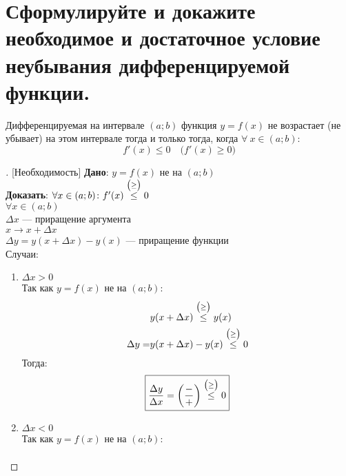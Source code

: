 \section{Сформулируйте и докажите необходимое и достаточное условие неубывания дифференцируемой функции.}

\begin{theorem}
	Дифференцируемая на интервале $(a;b)$ функция $y=f(x)$ не возрастает (не убывает) на этом интервале тогда и только тогда, когда $\forall\ x \in (a;b)\colon$
	\[ f'(x) \le 0\quad \Big(f'(x) \ge 0\Big) \]
\end{theorem}
\begin{proof}[][Необходимость]
	\textbf{Дано}: $y=f(x)$ не  на $(a;b)$\\
	\textbf{Доказать}: $\forall x \in (a;b)\colon f'(x) \overset{\scriptsize{\big(\ge \big)}}{\le} 0$\\
	$\forall x \in (a;b)$\\
	$\Delta x$ --- приращение аргумента\\
	$x \to x + \Delta x$\\
	$\Delta y = y(x + \Delta x) - y(x)$ --- приращение функции\\
	Случаи:
	\begin{enumerate}
		\item $\Delta x > 0$\\
		      Так как $y=f(x)$ не  на $(a;b)$: \vspace{-\topsep}
		      \begin{align*}
			                 & y(x+\Delta x) \overset{\scriptsize{\big(\ge \big)}}{\le} y(x)       \\
			      \Delta y = & y(x + \Delta x) - y(x) \overset{\scriptsize{\big(\ge \big)}}{\le} 0
		      \end{align*} \vspace{-\topsep}
		      Тогда:
		      \begin{gather*}
			      \boxed{\frac{\Delta y}{\Delta x} = \left(\frac{-}{+}\right) \overset{\scriptsize{\big(\ge \big)}}{\le} 0}
		      \end{gather*}
		\item $\Delta x < 0$\\
		      Так как $y=f(x)$ не  на $(a;b)$: \vspace{-\topsep}
		      \begin{align*}

\end{align*}
\end{enumerate}
\end{proof}
